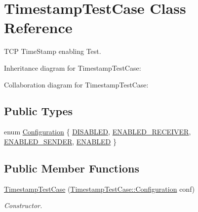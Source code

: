 \hypertarget{classTimestampTestCase}{}\section{Timestamp\+Test\+Case Class Reference}
\label{classTimestampTestCase}


T\+CP Time\+Stamp enabling Test.  




Inheritance diagram for Timestamp\+Test\+Case\+:


Collaboration diagram for Timestamp\+Test\+Case\+:
\subsection*{Public Types}
\begin{DoxyCompactItemize}
\item 
enum \hyperlink{classTimestampTestCase_a98399735307f2da16757d48f88ebbd6a}{Configuration} \{ \hyperlink{classTimestampTestCase_a98399735307f2da16757d48f88ebbd6aa7478101986b562387eea24a910632880}{D\+I\+S\+A\+B\+L\+ED}, 
\hyperlink{classTimestampTestCase_a98399735307f2da16757d48f88ebbd6aab1676abdfe892d1578256cdc2095cb8a}{E\+N\+A\+B\+L\+E\+D\+\_\+\+R\+E\+C\+E\+I\+V\+ER}, 
\hyperlink{classTimestampTestCase_a98399735307f2da16757d48f88ebbd6aaea98c375a5153b8db5af79c408d95e50}{E\+N\+A\+B\+L\+E\+D\+\_\+\+S\+E\+N\+D\+ER}, 
\hyperlink{classTimestampTestCase_a98399735307f2da16757d48f88ebbd6aad00a02cea964b70034eb6324f29bb891}{E\+N\+A\+B\+L\+ED}
 \}
\end{DoxyCompactItemize}
\subsection*{Public Member Functions}
\begin{DoxyCompactItemize}
\item 
\hyperlink{classTimestampTestCase_a789d0172c64fb9b8ba07614907d20182}{Timestamp\+Test\+Case} (\hyperlink{classTimestampTestCase_a98399735307f2da16757d48f88ebbd6a}{Timestamp\+Test\+Case\+::\+Configuration} conf)
\begin{DoxyCompactList}\small\item\em Constructor. \end{DoxyCompactList}\end{DoxyCompactItemize}
